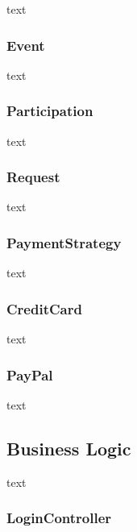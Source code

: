 \documentclass[11pt]{article}
\begin{document}
                text

            \subsubsection{Event} \label{subsubsec:event}

                text

            \subsubsection{Participation} \label{subsubsec:participation}

                text

            \subsubsection{Request} \label{subsubsec:request}

                text

            \subsubsection{PaymentStrategy} \label{subsubsec:pament-strategy}

                text

            \subsubsection{CreditCard} \label{subsubsec:credit-card}

                text

            \subsubsection{PayPal} \label{subsubsec:paypal}

                text

        \subsection{Business Logic} \label{subsec:business-logic}

            text

            \subsubsection{LoginController} \label{subsubsec:login-controller}
\end{document}
